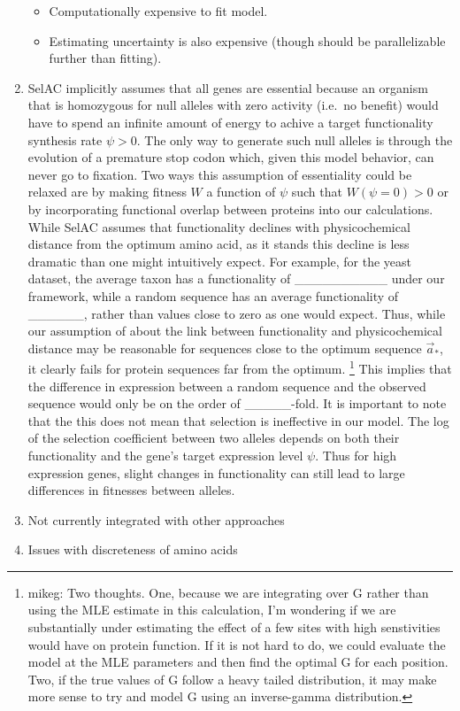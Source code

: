 \documentclass{article}
\newcommand{\selac}{SelAC\xspace}
\newcommand{\aoptvec}{\ensuremath{\Vec{a}_*}\xspace}
\begin{document}
\begin{enumerate}
\begin{itemize}
\item Computationally expensive to fit model.
\item Estimating uncertainty is also expensive (though should be parallelizable further than fitting).
\end{itemize}
\item \selac implicitly assumes that all genes are essential because an organism that is homozygous for null alleles with zero activity (i.e.~no benefit) would have to spend an infinite amount of energy to achive a target functionality synthesis rate $\psi > 0$.
  The only way to generate such null alleles is through the evolution of a premature stop codon which, given this model behavior, can never go to fixation.
  Two ways this assumption of essentiality could be relaxed are by making fitness $W$ a function of $\psi$ such that  $W(\psi = 0) > 0$ or by incorporating functional overlap between proteins into our calculations.
While \selac assumes that functionality declines with physicochemical distance from the optimum amino acid, as it stands this decline is less dramatic than one might intuitively expect.
For example, for the yeast dataset, the average taxon has a functionality of \_\_\_\_\_\_\_\_\_\_ under our framework, while a random sequence has an average functionality of \_\_\_\_\_\_, rather than values close to zero as one would expect.
Thus, while our assumption of about the link between functionality and physicochemical distance may be reasonable for sequences close to the optimum sequence \aoptvec, it clearly fails for protein sequences far from the optimum.
\footnote{mikeg: Two thoughts.
One, because we are integrating over G rather than using the MLE estimate in this calculation, I'm wondering if we are substantially under estimating the effect of a few sites with high senstivities would have on protein function.
If it is not hard to do, we could evaluate the model at the MLE parameters and then find the optimal G for each position.
Two, if the true values of G follow a heavy tailed distribution, it may make more sense to try and model G using an inverse-gamma distribution.
}
This implies that the difference in expression between a random sequence and the observed sequence would only be on the order of  \_\_\_\_\_-fold.
It is important to note that the this does not mean that selection is ineffective in our model.
The log of the selection coefficient between two alleles depends on both their functionality and the gene's target expression level $\psi$.
Thus for high expression genes, slight changes in functionality can still lead to large differences in fitnesses between alleles.
\item Not currently integrated with other approaches
\item Issues with discreteness of amino acids
\end{enumerate}
\end{document}
